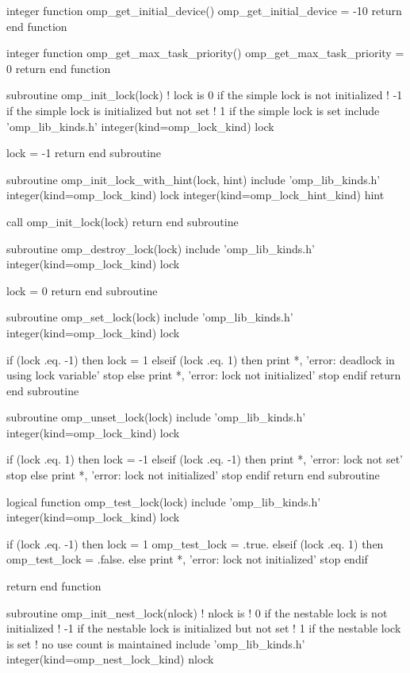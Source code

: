 {\begin{codepar}
integer function omp\_get\_initial\_device()
  omp\_get\_initial\_device = -10
  return
end function

integer function omp\_get\_max\_task\_priority()
  omp\_get\_max\_task\_priority = 0
  return
end function

subroutine omp\_init\_lock(lock)
  ! lock is 0 if the simple lock is not initialized
  !        -1 if the simple lock is initialized but not set
  !         1 if the simple lock is set
  include 'omp\_lib\_kinds.h'
  integer(kind=omp\_lock\_kind) lock

  lock = -1
  return
end subroutine

subroutine omp\_init\_lock\_with\_hint(lock, hint)
  include 'omp\_lib\_kinds.h'
  integer(kind=omp\_lock\_kind) lock
  integer(kind=omp\_lock\_hint\_kind) hint

  call omp\_init\_lock(lock)
  return
end subroutine

subroutine omp\_destroy\_lock(lock)
  include 'omp\_lib\_kinds.h'
  integer(kind=omp\_lock\_kind) lock

  lock = 0
  return
end subroutine

subroutine omp\_set\_lock(lock)
  include 'omp\_lib\_kinds.h'
  integer(kind=omp\_lock\_kind) lock

  if (lock .eq. -1) then
    lock = 1
  elseif (lock .eq. 1) then
    print *, 'error: deadlock in using lock variable'
    stop
  else
    print *, 'error: lock not initialized'
    stop
  endif
  return
end subroutine

subroutine omp\_unset\_lock(lock)
  include 'omp\_lib\_kinds.h'
  integer(kind=omp\_lock\_kind) lock

  if (lock .eq. 1) then
    lock = -1
  elseif (lock .eq. -1) then
    print *, 'error: lock not set'
    stop
  else
    print *, 'error: lock not initialized'
    stop
  endif
  return
end subroutine

logical function omp\_test\_lock(lock)
  include 'omp\_lib\_kinds.h'
  integer(kind=omp\_lock\_kind) lock

  if (lock .eq. -1) then
    lock = 1
    omp\_test\_lock = .true.
  elseif (lock .eq. 1) then
    omp\_test\_lock = .false.
  else
    print *, 'error: lock not initialized'
    stop
  endif

  return
end function

subroutine omp\_init\_nest\_lock(nlock)
  ! nlock is 
  ! 0 if the nestable lock is not initialized
  ! -1 if the nestable lock is initialized but not set
  ! 1 if the nestable lock is set
  ! no use count is maintained
  include 'omp\_lib\_kinds.h'
  integer(kind=omp\_nest\_lock\_kind) nlock


\end{codepar}}
